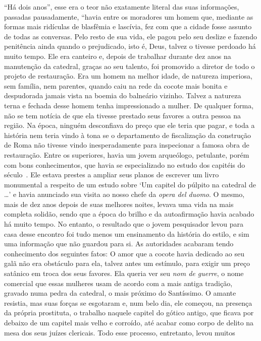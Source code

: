 ``Há dois anos'', esse era o teor não exatamente literal das suas
informações, passadas pausadamente, ``havia entre os moradores um homem
que, mediante as formas mais ridículas de blasfêmia e lascívia, fez com
que a cidade fosse assunto de todas as conversas. Pelo resto de sua
vida, ele pagou pelo seu deslize e fazendo penitência ainda quando o
prejudicado, isto é, Deus, talvez o tivesse perdoado há muito tempo. Ele
era canteiro e, depois de trabalhar durante dez anos na manutenção da
catedral, graças ao seu talento, foi promovido a diretor de todo o
projeto de restauração. Era um homem na melhor idade, de natureza
imperiosa, sem família, nem parentes, quando caiu na rede da cocote mais
bonita e despudorada jamais vista na boemia do balneário vizinho. Talvez
a natureza terna e fechada desse homem tenha impressionado a mulher. De
qualquer forma, não se tem notícia de que ela tivesse prestado seus
favores a outra pessoa na região. Na época, ninguém desconfiava do preço
que ele teria que pagar, e toda a história nem teria vindo à tona se o
departamento de fiscalização da construção de Roma não tivesse vindo
inesperadamente para inspecionar a famosa obra de restauração. Entre os
superiores, havia um jovem arqueólogo, petulante, porém com bons
conhecimentos, que havia se especializado no estudo dos capitéis do
século~. Ele estava prestes a ampliar seus planos de escrever um
livro monumental a respeito de um estudo sobre `Um capitel do púlpito na
catedral de \ldots{}' e havia anunciado sua visita ao nosso chefe da
\emph{opera del duomo}. O mesmo, mais de dez anos depois de suas
melhores noites, levava uma vida na mais completa solidão, sendo que a
época do brilho e da autoafirmação havia acabado há muito tempo. No
entanto, o resultado que o jovem pesquisador levou para casa desse
encontro foi tudo menos um ensinamento da história do estilo, e sim uma
informação que não guardou para si. As autoridades acabaram tendo
conhecimento dos seguintes fatos: O amor que a cocote havia dedicado ao
seu galã não era obstáculo para ela, talvez antes um estímulo, para
exigir um preço satânico em troca dos seus favores. Ela queria ver seu
\emph{nom de guerre}, o nome comercial que essas mulheres usam de acordo
com a mais antiga tradição, gravado numa pedra da catedral, o mais
próximo do Santíssimo. O amante resistia, mas suas forças se esgotaram
e, num belo dia, ele começou, na presença da própria prostituta, o
trabalho naquele capitel do gótico antigo, que ficava por debaixo de um
capitel mais velho e corroído, até acabar como corpo de delito na mesa
dos seus juízes clericais. Todo esse processo, entretanto, levou muitos
